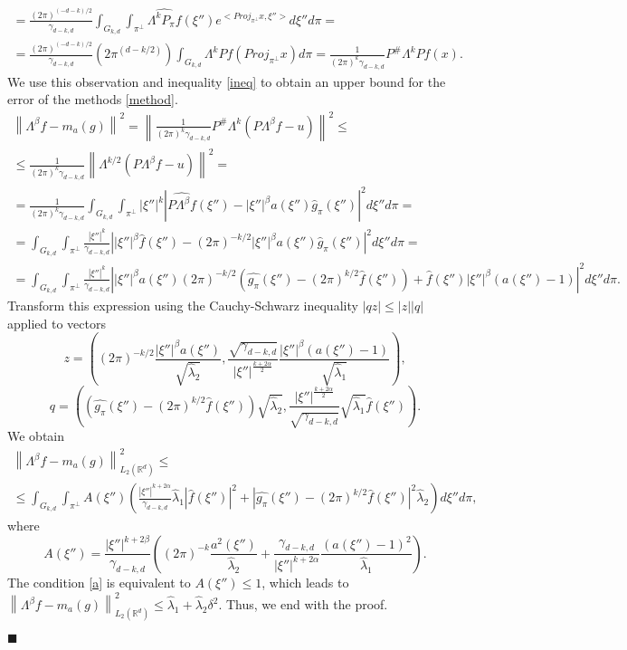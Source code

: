 \documentclass[12pt]{iopart}
\newenvironment{proof}
{\par\noindent{\bf Proof}}
{\hfill$\scriptstyle\blacksquare$}
\begin{document}
\begin{proof}
\begin{multline*}
		= \frac{(2\pi)^{(-d-k)/2}}{\gamma_{d-k,d}}\int_{G_{k,d}}\int_{\pi^\perp}\widehat{\Lambda^kP_\pi f}(\xi'')e^{<Proj_{\pi^\perp}x,\xi''>}d\xi''d\pi = \\
		= \frac{(2\pi)^{(-d-k)/2}}{\gamma_{d-k,d}}(2\pi^{(d-k/2)})\int_{G_{k,d}}\Lambda^kP f(Proj_{\pi^\perp}x)d\pi = \frac{1}{(2\pi)^k\gamma_{d-k,d}}P^\#\Lambda^kPf(x).
		\end{multline*}
		We use this observation and inequality \eqref{ineq} to obtain an upper bound for the error of the methods \eqref{method}.
		\begin{multline*}
		\left\|\Lambda^\beta f-m_a(g)\right\|^2=\left\|\frac{1}{(2\pi)^k\gamma_{d-k,d}}P^\#\Lambda^k(P\Lambda^\beta f-u)\right\|^2\leqslant\\
		\leqslant\frac{1}{(2\pi)^k\gamma_{d-k,d}}\left\|\Lambda^{k/2}(P\Lambda^\beta f-u)\right\|^2=\\
		=\frac{1}{(2\pi)^k\gamma_{d-k,d}}\int_{G_{k,d}}\int_{\pi^\perp}|\xi''|^k\left|\widehat{P\Lambda^\beta f}(\xi'')-|\xi''|^\beta a(\xi'')\widehat g_\pi(\xi'')\right|^2d\xi'' d\pi=\\
		=\int_{G_{k,d}}\int_{\pi^\perp}\frac{|\xi''|^k}{\gamma_{d-k,d}}\left||\xi''|^\beta\widehat{f}(\xi'')-(2\pi)^{-k/2}|\xi''|^\beta a(\xi'')\widehat g_\pi(\xi'')\right|^2d\xi'' d\pi=\\
		=\int_{G_{k,d}}\int_{\pi^\perp}\frac{|\xi''|^k}{\gamma_{d-k,d}}\left||\xi''|^\beta a(\xi'')(2\pi)^{-k/2}\left(\widehat{g_\pi }(\xi'')-(2\pi)^{k/2}\widehat f(\xi'' )\right)+\widehat f(\xi'')|\xi''|^\beta\left(a(\xi'')-1\right)\right|^2d\xi''d\pi .
		\end{multline*}
		Transform this expression using the Cauchy-Schwarz inequality $|qz|\leqslant |z||q|$ applied to vectors
		\[
		z=\left((2\pi)^{-k/2}\frac{|\xi''|^\beta a(\xi'')}{\sqrt{\widehat\lambda_2}},\frac{\sqrt{\gamma_{d-k,d}}}{|\xi''|^{\frac{k+2\alpha}{2}}}\frac{|\xi''|^\beta(a(\xi'')-1)}{\sqrt{\widehat\lambda_1}}\right),
		\]
		\[
		q=\left(\left(\widehat{g_\pi }(\xi'')-(2\pi)^{k/2}\widehat
		f(\xi'' )\right)\sqrt{\widehat\lambda_2},\frac{|\xi''|^{\frac{k+2\alpha}{2}}}{\sqrt{\gamma_{d-k,d}}}\sqrt{\widehat\lambda_1}\widehat f(\xi'' )\right).
		\]
		We obtain
		\begin{multline*}  
		\left\|\Lambda^\beta f-m_a(g)\right\|^2_{L_2(\mathbb R^d)}\leqslant  \\
		\leqslant \int_{G_{k,d}}\int_{\pi^\perp}
		A(\xi'')\left(\frac{|\xi''|^{k+2\alpha}}{\gamma_{d-k,d}}\widehat\lambda_1|\widehat f(\xi'')|^2+\left|\widehat{g_\pi}(\xi'')-(2\pi)^{k/2}\widehat f(\xi'')\right|^2\widehat\lambda_2\right)d\xi''d\pi,
		\end{multline*}
		where
		\[
		A(\xi'')=\frac{|\xi''|^{k+2\beta}}{\gamma_{d-k,d}}\left((2\pi)^{-k}\frac{a^2(\xi'')}{\widehat\lambda_2}+\frac{\gamma_{d-k,d}}{|\xi''|^{k+2\alpha}}\frac{(a(\xi'')-1)^2}{\widehat\lambda_1}\right).
		\]
		The condition \eqref{a} is equivalent to $A(\xi'')\leqslant 1$, which leads to $\left\|\Lambda^\beta f-m_a(g)\right\|^2_{L_2(\mathbb R^d)}\leqslant
		\widehat\lambda_1+\widehat\lambda_2\delta^2.$
		Thus, we end with the proof.
		
	\end{proof}
	
\end{document}
